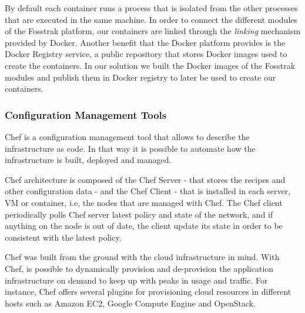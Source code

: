 By default each container runs a process that is isolated from the other processes that are executed in
the same machine. In order to connect the different modules of the Fosstrak platform, our containers are
linked through the \textit{linking} mechanism provided by Docker. Another benefit that the Docker platform
provides is the Docker Registry service, a public repository that stores Docker images used to create the
containers. In our solution we built the Docker images of the Fosstrak modules and publish them
in Docker registry to later be used to create our containers.
\subsubsection{Configuration Management Tools}
\label{subs:cm_tools}
Chef is a configuration management tool that allows to describe the infrastructure as code. In that way
it is possible to automate how the infrastructure is built, deployed and managed.

Chef architecture is composed of the Chef Server - that stores the recipes and other configuration data -
and the  Chef Client - that is installed in each server, VM or container, i.e, the nodes that are managed with Chef.
The Chef client periodically polls Chef server latest policy and state of the network, and if anything on the
node is out of date, the client update its state in order to be consistent with the latest policy.

Chef was built from the ground with the cloud infrastructure in mind. With Chef, is possible to dynamically
provision and de-provision the application infrastructure on demand to keep up with peaks in usage and traffic.
For instance, Chef offers several plugins for provisioning cloud resources in different hosts such as
Amazon EC2, Google Compute Engine and OpenStack.
